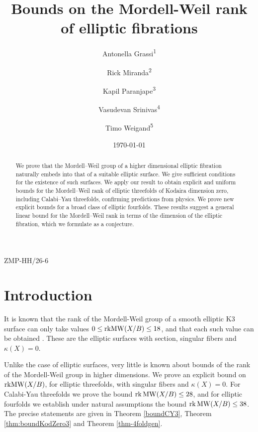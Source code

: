 \documentclass[11pt]{amsart}
\title[Bounds on Mordell-Weil ranks]{Bounds on the Mordell-Weil rank of elliptic  fibrations}
\author[Grassi]{Antonella Grassi\textsuperscript{1}}
\author[Miranda]{Rick Miranda\textsuperscript{2}}
\author[Paranjape]{Kapil Paranjape\textsuperscript{3}}
\author[Srinivas]{Vasudevan Srinivas\textsuperscript{4}}
\author[Weigand]{Timo Weigand\textsuperscript{5}}
\date{\today}
\theoremstyle{definition}
\theoremstyle{definition}
\theoremstyle{remark}
\theoremstyle{remark}
\theoremstyle{definition}
\theoremstyle{conjecture}
\newcommand{\MW}{\mathrm{MW}}
\begin{document}
\begin{flushright}
 \small{ZMP-HH/26-6} \vspace{4mm}
\end{flushright}



\begin{abstract} We prove that the Mordell–Weil group of a higher dimensional elliptic fibration naturally embeds into that of a suitable elliptic surface. We give sufficient conditions for the existence of such  surfaces. \color{black} We apply our result to obtain explicit and  uniform bounds for the Mordell–Weil rank of elliptic threefolds of Kodaira dimension zero, including Calabi–Yau threefolds, confirming predictions from physics. We prove new explicit bounds for a broad class of elliptic fourfolds. These results suggest a general linear bound for the Mordell–Weil rank in terms of the dimension of the elliptic fibration, which we formulate as a conjecture.

\end{abstract}


\maketitle

\section{Introduction}





  It is known that the rank of the Mordell-Weil group  of a  smooth  elliptic
  K3 surface can only take values 
  $0 \leq {\rm rk}\MW(X/B)\leq 18$,  and that each such value can be obtained \cite{Cox1982, Kuwata2000MW,Kloosterman2007}. These are  the elliptic surfaces with section, singular fibers and $\kappa(X)=0$.

Unlike the case of elliptic surfaces, very little is known  about bounds of the rank of the Mordell-Weil group in higher dimensions. 
We prove an explicit bound on $ {\rm rk}\MW(X/B)$, for elliptic threefolds, with singular fibers and   $\kappa(X) = 0$. 
  For  Calabi-Yau threefolds we prove the  bound 
  $\mathrm{rk}\,{\rm MW} (X/B) \le 28$, and for elliptic fourfolds we establish  under natural assumptions the %
  bound $\mathrm{rk}\,{\rm MW} (X/B) \le 38$.  The precise statements %
 are given in   Theorem \ref{boundCY3}, Theorem \ref{thm:boundKodZero3} and Theorem \ref{thm-4foldgen}.
 
\end{document}
